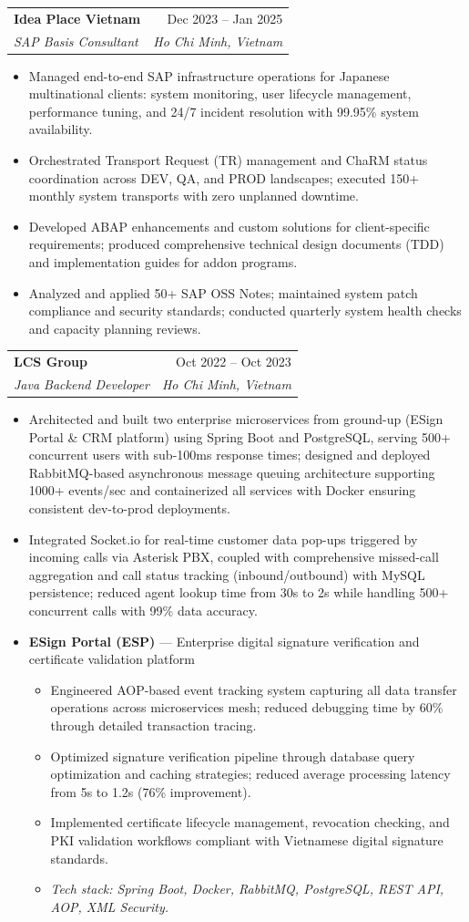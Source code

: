 \documentclass[letterpaper,11pt]{article}
\makeatletter
\newcommand{\resumeItem}[1]{
  \item\small{{#1\vspace{-1pt}}}
}
\newcommand{\resumeSubheading}[4]{
  \vspace{-2pt}\item
    \begin{tabular*}{0.97\textwidth}[t]{l@{\extracolsep{\fill}}r}
      \textbf{\small #1} & \small #2 \\
      \textit{\small\color{accent} #3} & \textit{\small #4} \\
    \end{tabular*}\vspace{-5pt}
}
\newcommand{\techStack}[1]{%
  \vspace{1pt}
  {\small\textit{Tech stack: #1}}%
}
\newcommand{\resumeItemListStart}{%
  \begin{itemize}[leftmargin=0.22in, topsep=2pt, parsep=0pt, partopsep=0pt, itemsep=2pt]%
}
\newcommand{\resumeItemListEnd}{\end{itemize}\vspace{-2pt}}
\newenvironment{projectBlock}[2]{%
  \vspace{-4pt}
  \begin{itemize}[leftmargin=0.22in, label={}, topsep=0pt, parsep=0pt, itemsep=0pt]
  \item \small\textbf{#1} --- #2
  \begin{itemize}[leftmargin=0.18in, topsep=1pt, parsep=0pt, itemsep=1pt]
}{%
  \end{itemize}
  \end{itemize}
  \vspace{-2pt}
}
\makeatother
\begin{document}
  \resumeSubheading
    {Idea Place Vietnam}{Dec 2023 -- Jan 2025}
    {SAP Basis Consultant}{Ho Chi Minh, Vietnam}
  \resumeItemListStart
    \resumeItem{Managed end-to-end SAP infrastructure operations for Japanese multinational clients: system monitoring, user lifecycle management, performance tuning, and 24/7 incident resolution with 99.95\% system availability.}
    \resumeItem{Orchestrated Transport Request (TR) management and ChaRM status coordination across DEV, QA, and PROD landscapes; executed 150+ monthly system transports with zero unplanned downtime.}
    \resumeItem{Developed ABAP enhancements and custom solutions for client-specific requirements; produced comprehensive technical design documents (TDD) and implementation guides for addon programs.}
    \resumeItem{Analyzed and applied 50+ SAP OSS Notes; maintained system patch compliance and security standards; conducted quarterly system health checks and capacity planning reviews.}
  \resumeItemListEnd

  \resumeSubheading
    {LCS Group}{Oct 2022 -- Oct 2023}
    {Java Backend Developer}{Ho Chi Minh, Vietnam}
  \resumeItemListStart
    \resumeItem{Architected and built two enterprise microservices from ground-up (ESign Portal \& CRM platform) using Spring Boot and PostgreSQL, serving 500+ concurrent users with sub-100ms response times; designed and deployed RabbitMQ-based asynchronous message queuing architecture supporting 1000+ events/sec and containerized all services with Docker ensuring consistent dev-to-prod deployments.}
    \resumeItem{Integrated Socket.io for real-time customer data pop-ups triggered by incoming calls via Asterisk PBX, coupled with comprehensive missed-call aggregation and call status tracking (inbound/outbound) with MySQL persistence; reduced agent lookup time from 30s to 2s while handling 500+ concurrent calls with 99\% data accuracy.}
  \resumeItemListEnd

  \begin{projectBlock}{ESign Portal (ESP)}{Enterprise digital signature verification and certificate validation platform}
    \resumeItem{Engineered AOP-based event tracking system capturing all data transfer operations across microservices mesh; reduced debugging time by 60\% through detailed transaction tracing.}
    \resumeItem{Optimized signature verification pipeline through database query optimization and caching strategies; reduced average processing latency from 5s to 1.2s (76\% improvement).}
    \resumeItem{Implemented certificate lifecycle management, revocation checking, and PKI validation workflows compliant with Vietnamese digital signature standards.}
    \item \techStack{Spring Boot, Docker, RabbitMQ, PostgreSQL, REST API, AOP, XML Security.}
  \end{projectBlock}
\end{document}

